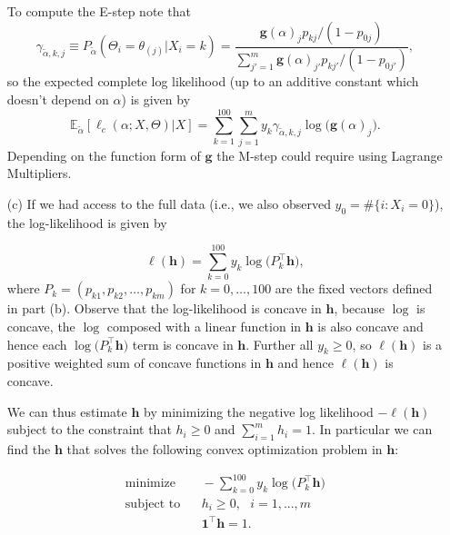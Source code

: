 \begin{itemize}
	To compute the E-step note that $$\gamma_{\tilde{\alpha},k,j} \equiv P_{\tilde{\alpha}} ( \Theta_i = \theta_{(j)} |X_i =k ) =\frac{\mathbf{g} (\alpha)_j p_{kj}/(1-p_{0j})}{ \sum_{j'=1}^m \mathbf{g} (\alpha)_{j'} p_{kj'}/(1-p_{0j'}) },$$ so the expected complete log likelihood (up to an additive constant which doesn't depend on $\alpha$) is given by $$\mathbb{E}_{\tilde{\alpha}}[\ell_c( \alpha; X , \Theta )| X] = \sum_{k=1}^{100} \sum_{j=1}^m y_k \gamma_{\tilde{\alpha},k,j} \log \big( \mathbf{g} (\alpha)_j \big).$$ Depending on the function form of $\mathbf{g}$ the M-step could require using Lagrange Multipliers.

\item[(c)]  If we had access to the full data (i.e., we also observed $y_0 = \#\{i: X_i = 0\}$), the log-likelihood is given by 

$$\ell(\mathbf{h}) = \sum_{k = 0}^{100} y_k \log \Big( P_k^\top  \mathbf{h} \Big),$$ where $P_k = (p_{k1} , p_{k2} , \dots, p_{km})$ for $k=0,\dots,100$ are the fixed vectors defined in part (b). Observe that the log-likelihood is concave in $\mathbf{h}$, because $\log$ is concave, the $\log$ composed with a linear function in $\mathbf{h}$ is also concave and hence each $ \log \Big( P_k^\top  \mathbf{h} \Big)$ term is concave in $\mathbf{h}$. Further all $y_k \geq 0$, so $\ell(\mathbf{h})$ is a positive weighted sum of concave functions in $\mathbf{h}$ and hence $\ell(\mathbf{h})$ is concave.

We can thus estimate $\mathbf{h}$ by minimizing the negative log likelihood $-\ell(\mathbf{h})$ subject to the constraint that $h_i \geq 0$ and $\sum_{i=1}^m h_i =1$. In particular we can find the $\mathbf{h}$ that solves the following convex optimization problem in $\mathbf{h}$:

 $$\begin{aligned}
 \text{minimize} & \ \ \ \ -\sum_{k = 0}^{100} y_k \log \Big( P_k^\top  \mathbf{h} \Big)
 \\ \text{subject to} & \ \ \ \ h_i \geq 0, \ \ \ i=1,...,m 
 \\ & \ \ \ \ \mathbf{1}^\top  \mathbf{h} =1.
 \end{aligned}$$


\end{itemize}

